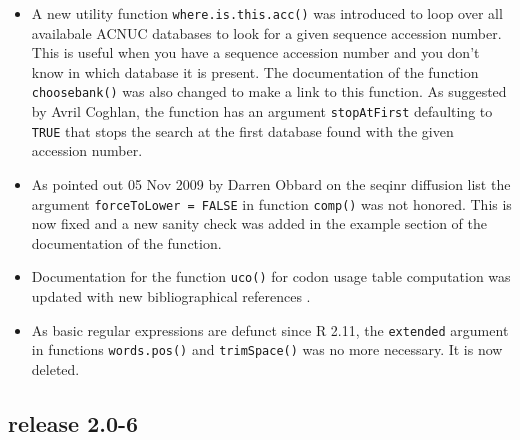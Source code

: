 \documentclass{article}
\begin{document}
\begin{itemize}

\item A new utility function \texttt{where.is.this.acc()} was introduced
to loop over all availabale ACNUC databases to look for
a given sequence accession number. This is useful when you have
a sequence accession number and you don't know in which database
it is present. The documentation of the function \texttt{choosebank()}
was also changed to make a link to this function. As suggested by 
Avril Coghlan, the function has an argument \texttt{stopAtFirst} defaulting
to \texttt{TRUE} that stops the search at the first database found
with the given accession number.

\item As pointed out 05 Nov 2009 by Darren Obbard on the seqinr diffusion list
the argument \texttt{forceToLower = FALSE} in function \texttt{comp()}
was not honored. This is now fixed and a new sanity check was added in
the example section of the documentation of the function.

\item Documentation for the function \texttt{uco()} for codon usage
table computation was updated with new bibliographical 
references \cite{lobrychessel, SuzukiH2008}.

\item As basic regular expressions are defunct since R 2.11, the
\texttt{extended} argument in functions \texttt{words.pos()} and
\texttt{trimSpace()} was no more necessary. It is now deleted. 

\end{itemize}

\subsection*{release 2.0-6}
\end{document}
